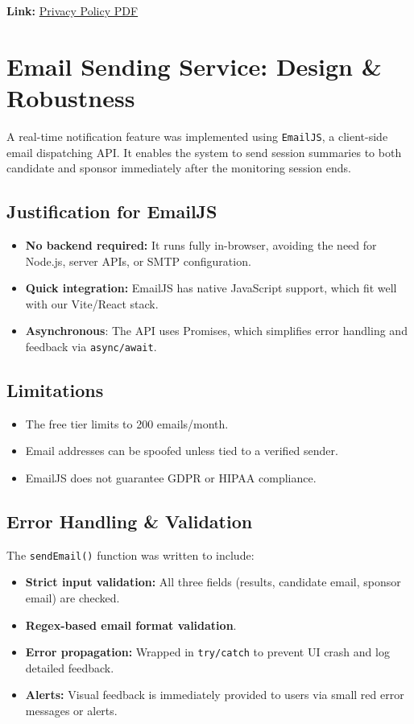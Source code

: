 \documentclass[a4paper,12pt]{article}
\begin{document}
\noindent\textbf{Link:} \href{https://fefe29.github.io/Automated-Online-Test-Monitoring-System_V4/privacy_policy.pdf}{Privacy Policy PDF}

\section{Email Sending Service: Design \& Robustness}
A real-time notification feature was implemented using \texttt{EmailJS}, a client-side email dispatching API. It enables the system to send session summaries to both candidate and sponsor immediately after the monitoring session ends.

\subsection*{Justification for EmailJS}
\begin{itemize}
    \item \textbf{No backend required:} It runs fully in-browser, avoiding the need for Node.js, server APIs, or SMTP configuration.
    \item \textbf{Quick integration:} EmailJS has native JavaScript support, which fit well with our Vite/React stack.
    \item \textbf{Asynchronous}: The API uses Promises, which simplifies error handling and feedback via \texttt{async/await}.
\end{itemize}

\subsection*{Limitations}
\begin{itemize}
    \item The free tier limits to 200 emails/month.
    \item Email addresses can be spoofed unless tied to a verified sender.
    \item EmailJS does not guarantee GDPR or HIPAA compliance.
\end{itemize}

\subsection*{Error Handling \& Validation}
The \texttt{sendEmail()} function was written to include:
\begin{itemize}
    \item \textbf{Strict input validation:} All three fields (results, candidate email, sponsor email) are checked.
    \item \textbf{Regex-based email format validation}.
    \item \textbf{Error propagation:} Wrapped in \texttt{try/catch} to prevent UI crash and log detailed feedback.
    \item \textbf{Alerts:} Visual feedback is immediately provided to users via small red error messages or alerts.
\end{itemize}
\end{document}

